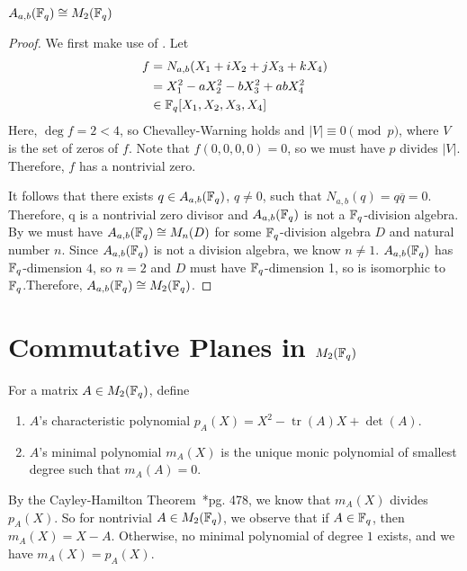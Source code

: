 \documentclass{amsart}
\begin{document}
\begin{theorem}\label{gen-quat-finite}
    $A_{a,b}(\protect\mathbb{F}_q) \cong M_2(\protect\mathbb{F}_q)$ 
\end{theorem}
\begin{proof}
    We first make use of . Let
    \begin{align*}
        f &= N_{a,b}(X_1 + iX_2 + jX_3 + kX_4) \\
            &= X_1^2 -aX_2^2 -bX_3^2 + abX_4^2 \\
            &\in \protect\mathbb{F}_q[X_1, X_2, X_3, X_4]
    \end{align*}
    Here, $\deg f = 2 < 4$, so Chevalley-Warning holds and $|V| \equiv 0 \pmod{p}$, where $V$ is the set of zeros of $f$. Note that $f(0,0,0,0) = 0$, so we must have $p$ divides $|V|$. Therefore, $f$ has a nontrivial zero.

    It follows that there exists $q \in A_{a,b}(\protect\mathbb{F}_q)$, $q \neq 0$, such that $N_{a,b}(q) = q \overline{q} = 0$. Therefore, q is a nontrivial zero divisor and $A_{a,b}(\protect\mathbb{F}_q)$ is not a $\protect\mathbb{F}_q$-division algebra. By  we must have $A_{a,b}(\protect\mathbb{F}_q) \cong M_n(D)$ for some $\protect\mathbb{F}_q$-division algebra $D$ and natural number $n$. Since $A_{a,b}(\protect\mathbb{F}_q)$ is not a division algebra, we know $n\neq1$. $A_{a,b}(\protect\mathbb{F}_q)$ has $\protect\mathbb{F}_q$-dimension $4$, so $n = 2$ and $D$ must have $\protect\mathbb{F}_q$-dimension 1, so is isomorphic to $\protect\mathbb{F}_q$.Therefore, $A_{a,b}(\protect\mathbb{F}_q) \cong M_2(\protect\mathbb{F}_q)$. 
\end{proof}

\section{Commutative Planes in $M_2(\protect\mathbb{F}_q)$}
    \begin{defn}
        For a matrix $A \in M_2(\protect\mathbb{F}_q)$, define
        \begin{enumerate}
            \item $A$'s characteristic polynomial $p_A(X) = X^2 -\operatorname{tr}(A)X + \det(A)$.
            \item $A$'s minimal polynomial $m_A(X)$ is the unique monic polynomial of smallest degree such that $m_A(A) = 0$.
        \end{enumerate}
    \end{defn}

    By the Cayley-Hamilton Theorem~\cite{DandF}*{pg. 478}, we know that $m_A(X)$ divides $p_A(X)$. So for nontrivial $A \in M_2(\protect\mathbb{F}_q)$, we observe that if $A \in \protect\mathbb{F}_q$, then $m_A(X) = X - A$. Otherwise, no minimal polynomial of degree $1$ exists, and we have $m_A(X) = p_A(X)$. 
\end{document}

